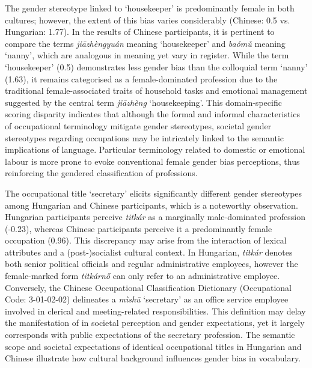 \documentclass[11pt]{article}
\newcommand{\zh}[1]{\simplifiedchinesefont{#1}\rmfamily}
\begin{document}

The gender stereotype linked to `housekeeper' is predominantly female in both cultures; however, the extent of this bias varies considerably (Chinese: 0.5 vs. Hungarian: 1.77). In the results of Chinese participants, it is pertinent to compare the terms \zh{家政员} \textit{jiāzhèngyuán} meaning `housekeeper' and \zh{保姆} \textit{baómǔ} meaning `nanny', which are analogous in meaning yet vary in register. While the term `housekeeper' (0.5) demonstrates less gender bias than the colloquial term `nanny' (1.63), it remains categorised as a female-dominated profession due to the traditional female-associated traits of household tasks and emotional management suggested by the central term \zh{家政} \textit{jiāzhèng} `housekeeping'. This domain-specific scoring disparity indicates that although the formal and informal characteristics of occupational terminology mitigate gender stereotypes, societal gender stereotypes regarding occupations may be intricately linked to the semantic implications of language. Particular terminology related to domestic or emotional labour is more prone to evoke conventional female gender bias perceptions, thus reinforcing the gendered classification of professions.

The occupational title `secretary' elicits significantly different gender stereotypes among Hungarian and Chinese participants, which is a noteworthy observation. Hungarian participants perceive \textit{titkár} as a marginally male-dominated profession (-0.23), whereas Chinese participants perceive it a predominantly female occupation (0.96). This discrepancy may arise from the interaction of lexical attributes and a (post-)socialist cultural context. In Hungarian, \textit{titkár} denotes both senior political officials and regular administrative employees, however the female-marked form \textit{titkárnő} can only refer to an administrative employee. Conversely, the Chinese Occupational Classification Dictionary (Occupational Code: 3-01-02-02) delineates a \zh{秘书} \textit{mìshū} `secretary' as an office service employee involved in clerical and meeting-related responsibilities. This definition may delay the manifestation of in societal perception and gender expectations, yet it largely corresponds with public expectations of the secretary profession. The semantic scope and societal expectations of identical occupational titles in Hungarian and Chinese illustrate how cultural background influences gender bias in vocabulary.
\end{document}
